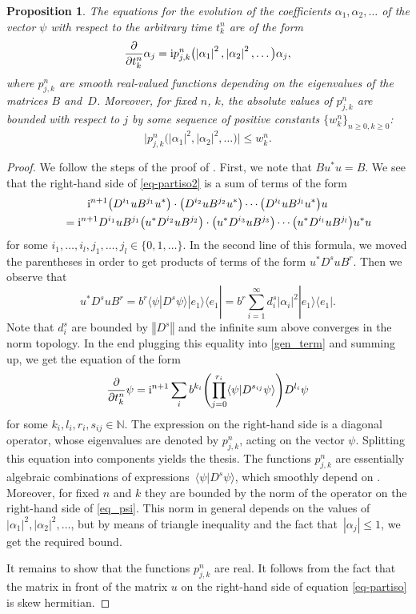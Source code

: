 \documentclass[10pt,a4paper]{amsart}
\newtheorem{prop}[thm]{Proposition}
\theoremstyle{definition}
\numberwithin{equation}{section}
\newcommand{\norm}[1]{\left\Vert#1\right\Vert}
\renewcommand{\sc}[2]{\langle #1|#2 \rangle}
\newcommand{\proj}[2]{|#1 \rangle \langle #2|}
\newcommand{\N}{\mathbb N}
\newcommand{\abs}[1]{\left\vert#1\right\vert}
\newcommand{\be}{\begin{equation}}
\newcommand{\ee}{\end{equation}}
\begin{document}
\begin{prop}\label{prop_rank1}
The equations for the evolution of the coefficients $\alpha_1,\alpha_2,\dots$ of the vector $\psi$ with respect to the arbitrary time $t^n_k$ are of the form
\begin{gather*}%
 \frac\partial{\partial t^n_k} \alpha_j = {\rm i} p_{j,k}^n\bigl(\abs{\alpha_1}^2,\abs{\alpha_2}^2,\dots\bigr) \alpha_j,
\end{gather*}
where $p_{j,k}^n$ are smooth real-valued functions depending on the eigenvalues of the matrices $B$ and~$D$. Moreover, for fixed $n$, $k$, the absolute values of $p_{j,k}^n$ are bounded with respect to $j$ by some sequence of positive constants $\{w^n_k\}_{n\geq 0, k\geq 0}$:
\[\bigl|p_{j,k}^n\bigl(\abs{\alpha_1}^2,\abs{\alpha_2}^2,\dots\bigr)\bigr|\leq w^n_k.\]
\end{prop}
\begin{proof}
We follow the steps of the proof of \cite[Proposition 3]{GT-partiso-bial}.
First, we note that $Bu^*u = B$.
We see that the right-hand side of \eqref{eq-partiso2}
is a sum of terms of the form
\begin{gather}
{\rm i}^{n+1} \bigl(D^{i_1} u B^{j_1} u^*\bigr)\cdot \bigl(D^{i_2} u B^{j_2} u^*\bigr) \cdots \bigl(D^{i_l} u B^{j_l} u^*\bigr) u\nonumber
\\
\qquad= {\rm i}^{n+1} D^{i_1} u B^{j_1} \bigl(u^* D^{i_2} u B^{j_2}\bigr) \cdot \bigl(u^* D^{i_3} u B^{j_3}\bigr)\cdots \bigl(u^*D^{i_l} u B^{j_l}\bigr) u^* u\label{gen_term}
\end{gather}
for some $i_1,\dots, i_l, j_1,\dots, j_l\in \{0,1,\dots\}$.
In the second line of this formula, we moved the parentheses in order to get products of terms of the form $u^*D^s u B^r$. Then we observe that
\[
 u^*D^s u B^r = b^r \sc{\psi}{D^s\psi} \proj{e_1}{e_1} = b^r \sum_{i=1}^\infty d_i^s \abs{\alpha_i}^2 \proj{e_1}{e_1} .\]
Note that $d^s_i$ are bounded by $\norm{D^s}$ and the infinite sum above converges in the norm topology. In the end plugging this equality into \eqref{gen_term} and summing up, we get the equation of the form
\be\label{eq_psi}
 \frac\partial{\partial t^n_k} \psi = {\rm i}^{n+1} \sum_i b^{k_i} \Biggl(\prod_{j=0}^{r_i} \sc{\psi}{D^{s_{ij}}\psi}\Biggr) D^{l_i}\psi
\ee
for some $k_i,l_i,r_i,s_{ij}\in\N$. The expression on the right-hand side is a diagonal operator, whose eigenvalues are denoted by $p_{j,k}^n$, acting on the vector $\psi$.
Splitting this equation into components yields the thesis.
The functions $p_{j,k}^n$ are essentially algebraic combinations of expressions~$\sc{\psi}{D^s\psi}$, which smoothly depend on \smash{$\abs{\alpha_1}^2, \abs{\alpha_2}^2, \dots$}. Moreover, for fixed $n$ and $k$ they are bounded by the norm of the operator on the right-hand side of \eqref{eq_psi}. This norm in general depends on the values of $\abs{\alpha_1}^2, \abs{\alpha_2}^2, \dots$, but by means of triangle inequality and the fact that~${\abs{\alpha_j}\leq 1}$, we get the required bound.

It remains to show that the functions $p_{j,k}^n$ are real. It follows from the fact that the matrix in front of the matrix $u$ on the right-hand side of equation \eqref{eq-partiso} is skew hermitian.
\end{proof}
\end{document}
